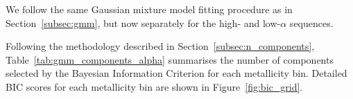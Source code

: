 \documentclass[a4paper,12pt]{article}
\begin{document}
We follow the same Gaussian mixture model fitting procedure as in
Section~\ref{subsec:gmm}, but now separately for the high- and low-$\alpha$ sequences.

\begin{table}[H]
  \centering
  \caption{Number of Gaussian Mixture components selected by the BIC for each metallicity bin, split by $\alpha$-sequence.}
    \label{tab:gmm_components_alpha}
\end{table}

Following the methodology described in Section~\ref{subsec:n_components}, Table~\ref{tab:gmm_components_alpha} summarises 
the number of components selected by the Bayesian Information Criterion for each metallicity bin.
Detailed BIC scores for each metallicity bin are shown in Figure~\ref{fig:bic_grid}.
\end{document}
